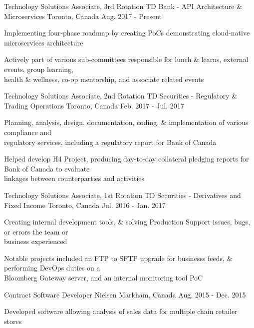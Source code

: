 \begin{cventries}
   \cventry
     {Technology Solutions Associate, 3rd Rotation}
     {TD Bank - API Architecture \& Microservices}
     {Toronto, Canada}
     {Aug. 2017 - Present}
     {
      \begin{cvitems}
       \item {Implementing four-phase roadmap by creating PoCs demonstrating cloud-native microservices architecture}
       \item {Actively part of various sub-committees responsible for lunch \& learns, external events, group learning, \\health \& wellness, co-op mentorship, and associate related events}
      \end{cvitems}
      }
   \cventry
    {Technology Solutions Associate, 2nd Rotation}
    {TD Securities - Regulatory \& Trading Operations}
    {Toronto, Canada}
    {Feb. 2017 - Jul. 2017}
    {
      \begin{cvitems}
        \item {Planning, analysis, design, documentation, coding, \& implementation of various compliance and \\regulatory services, including a regulatory report for Bank of Canada}
        \item {Helped develop H4 Project, producing day-to-day collateral pledging reports for Bank of Canada to evaluate \\linkages between counterparties and activities}
      \end{cvitems}
    }
  \cventry
    {Technology Solutions Associate, 1st Rotation}
    {TD Securities - Derivatives and Fixed Income}
    {Toronto, Canada}
    {Jul. 2016 - Jan. 2017}
    {
      \begin{cvitems}
        \item {Creating internal development tools, \& solving Production Support issues, bugs, or errors the team or \\business experienced}
        \item {Notable projects included an FTP to SFTP upgrade for businesss feeds, \& performing DevOps duties on a \\Bloomberg Gateway server, and an internal monitoring tool PoC}
      \end{cvitems}
    }
  \cventry
    {Contract Software Developer}
    {Nielsen}
    {Markham, Canada}
    {Aug. 2015 - Dec. 2015}
    {
      \begin{cvitems}
        \item {Developed software allowing analysis of sales data for multiple chain retailer stores}

\end{cvitems}}
\end{cventries}
